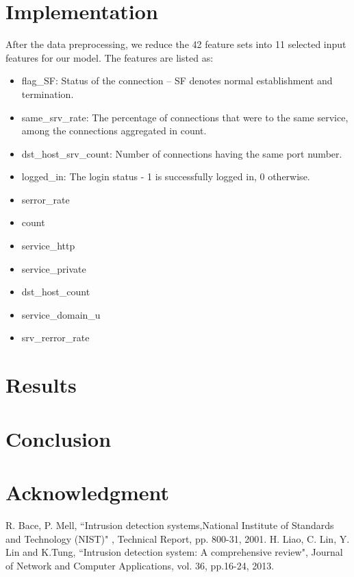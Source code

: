 \documentclass[conference]{IEEEtran}
\begin{document}
\section{Implementation}
After the data preprocessing, we reduce the 42 feature sets into 11 selected input features for our model. The features are listed as:
\begin{itemize}
\item flag\_SF: Status of the connection – SF denotes normal establishment and termination.
\item same\_srv\_rate: The percentage of connections that were to the same service, among the connections aggregated in count.
\item dst\_host\_srv\_count: Number of connections having the same port number.
\item logged\_in: The login status - 1 is successfully logged in, 0 otherwise.
\item serror\_rate
\item count
\item service\_http
\item service\_private
\item dst\_host\_count
\item service\_domain\_u
\item srv\_rerror\_rate
\end{itemize}

\section{Results}

\section{Conclusion}

\section*{Acknowledgment}

\begin{thebibliography}{00}
 R. Bace, P. Mell, ``Intrusion detection systems,National Institute of Standards and
Technology (NIST)" , Technical Report, pp. 800-31, 2001.
 H. Liao, C. Lin, Y. Lin and K.Tung, ``Intrusion detection system: A comprehensive review", Journal of Network and Computer Applications, vol. 36, pp.16-24, 2013.
\end{thebibliography}
\end{document}
